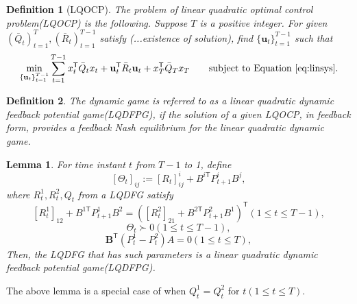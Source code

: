 \documentclass{article}
\newcommand{\transpose}{\mathsf{T}}
\newtheorem{lemma}{Lemma}
\newtheorem{definition}{Definition}
\begin{document}
\begin{definition}[LQOCP]
    The problem of linear quadratic optimal control problem(LQOCP) is the following.
    Suppose $T$ is a positive integer. For given $(\bar{Q}_{t})_{t=1}^{T},(\bar{R}_{t})_{t=1}^{T-1}$ satisfy (...existence of solution), find $\{\mathbf{u}_{t}\}_{t=1}^{T-1}$ such that
    \begin{equation}\label{eq:LQOCP}
\begin{split}
    \min_{\{\mathbf{u}_{t}\}_{t=1}^{T-1}} \sum_{t=1}^{T-1} x_{t}^{\transpose}\bar{Q}_{t}x_{t} + \mathbf{u}_{t}^{\transpose}\bar{R}_{t}\mathbf{u}_{t} + x_{T}^{\transpose}\bar{Q}_{T}x_{T} \text{\qquad subject to Equation \eqref{eq:linsys}}.
\end{split}
\end{equation}
\end{definition}



\begin{definition}
    The dynamic game is referred to as a linear quadratic dynamic feedback potential game(LQDFPG), if the solution of a given LQOCP, in feedback form, provides a feedback Nash equilibrium for the linear quadratic dynamic game. 
\end{definition}

\begin{lemma}
    For time instant $t$ from $T-1$ to 1, define
        \begin{equation}\label{eq:Theta}
        [\Theta_{t}]_{ij} := [R_{t}]^{i}_{ij} + B^{i\transpose}P_{t+1}^{i}B^{j},
        \end{equation}
    where $R_{t}^{1},R_{t}^{2},Q_{t}$ from a LQDFG satisfy
        \begin{equation}\label{eq:costFPDG1}
            [R_{t}^{1}]_{12} + B^{1\transpose}P_{t+1}^{1}B^{2} = ([R_{t}^{2}]_{21} + B^{2\transpose}P_{t+1}^{2}B^{1})^{\transpose}(1\leq t\leq T-1),
        \end{equation}
        \begin{equation}\label{eq:costFPDG2}
            \Theta_{t} \succ 0(1\leq t \leq T-1),
        \end{equation}
        \begin{equation}\label{eq:costFPDG3}
            \mathbf{B}^{\transpose}(P_{t}^{1}-P_{t}^{2})A=0(1\leq t \leq T),
        \end{equation}
    Then, the LQDFG that has such parameters is a linear quadratic dynamic feedback potential game(LQDFPG).
\end{lemma}
The above lemma is a special case of \cite[Theorem 6]{prasad_structure_2023} when $Q_{t}^{1}=Q_{t}^{2}$ for $t(1\leq t \leq T)$.
\end{document}
